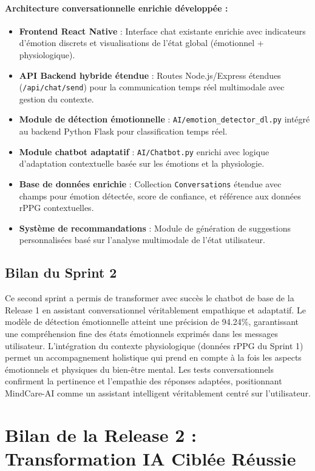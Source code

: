 \paragraph{Architecture conversationnelle enrichie développée :}
\begin{itemize}
    \item \textbf{Frontend React Native} : Interface chat existante enrichie avec indicateurs d'émotion discrets et visualisations de l'état global (émotionnel + physiologique).
    \item \textbf{API Backend hybride étendue} : Routes Node.js/Express étendues (\texttt{/api/chat/send}) pour la communication temps réel multimodale avec gestion du contexte.
    \item \textbf{Module de détection émotionnelle} : \texttt{AI/emotion\_detector\_dl.py} intégré au backend Python Flask pour classification temps réel.
    \item \textbf{Module chatbot adaptatif} : \texttt{AI/Chatbot.py} enrichi avec logique d'adaptation contextuelle basée sur les émotions et la physiologie.
    \item \textbf{Base de données enrichie} : Collection \texttt{Conversations} étendue avec champs pour émotion détectée, score de confiance, et référence aux données rPPG contextuelles.
    \item \textbf{Système de recommandations} : Module de génération de suggestions personnalisées basé sur l'analyse multimodale de l'état utilisateur.
\end{itemize}


\subsection{Bilan du Sprint 2}
Ce second sprint a permis de transformer avec succès le chatbot de base de la Release 1 en assistant conversationnel véritablement empathique et adaptatif. Le modèle de détection émotionnelle atteint une précision de 94.24\%, garantissant une compréhension fine des états émotionnels exprimés dans les messages utilisateur. L'intégration du contexte physiologique (données rPPG du Sprint 1) permet un accompagnement holistique qui prend en compte à la fois les aspects émotionnels et physiques du bien-être mental. Les tests conversationnels confirment la pertinence et l'empathie des réponses adaptées, positionnant MindCare-AI comme un assistant intelligent véritablement centré sur l'utilisateur.

\section{Bilan de la Release 2 : Transformation IA Ciblée Réussie}

